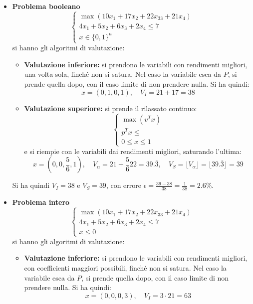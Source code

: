\documentclass[a4paper,11pt]{article}
\begin{document}
\begin{itemize}
	\item \textbf{\textsf{Problema booleano}} \\
	\[
		\begin{cases}
			\max(10 x_1 + 17 x_2 + 22 x_33 + 21 x_4) \\ 
			4 x_1 + 5 x_2 + 6 x_3 + 2 x_4 \leq 7 \\ 
			x \in \{ 0, 1 \}^n
		\end{cases}
	\]
	si hanno gli algoritmi di valutazione:
	\begin{itemize}
		\item \textbf{Valutazione inferiore:} si prendono le variabili con rendimenti migliori, una volta sola, finché non si satura.
			Nel caso la variabile esca da $P$, si prende quella dopo, con il caso limite di non prendere nulla.
			Si ha quindi:
			$$ x = (0, 1, 0, 1), \quad V_I = 21 + 17 = 38 $$
		\item \textbf{Valutazione superiore:} si prende il rilassato continuo:
			\[
				\begin{cases}
					\max (v^T x) \\ 
					p^T x \leq \\ 
					0 \leq x \leq 1
				\end{cases}
			\]
			e si riempie con le variabili dai rendimenti migliori, saturando l'ultima:
			$$ x = \left( 0, 0, \frac{5}{6}, 1 \right), \quad V_\alpha = 21 + \frac{5}{6} 22 = 39.\overline{3}, \quad V_S = \lfloor V_\alpha \rfloor = \lfloor 39.\overline{3} \rfloor = 39 $$
	\end{itemize}
	Si ha quindi $V_I = 38$ e $V_S = 39$, con errore $\epsilon = \frac{39 - 38}{38} = \frac{1}{38} = 2.6\%$.
\item \textbf{\textsf{Problema intero}} \\
	\[
		\begin{cases}
			\max(10 x_1 + 17 x_2 + 22 x_33 + 21 x_4) \\ 
			4 x_1 + 5 x_2 + 6 x_3 + 2 x_4 \leq 7 \\ 
			x \leq 0
		\end{cases}
	\]
	si hanno gli algoritmi di valutazione:
	\begin{itemize}
		\item \textbf{Valutazione inferiore:} si prendono le variabili con rendimenti migliori, con coefficienti maggiori possibili, finché non si satura.
			Nel caso la variabile esca da $P$, si prende quella dopo, con il caso limite di non prendere nulla.
			Si ha quindi:
			$$ x = (0, 0, 0, 3), \quad V_I = 3 \cdot 21 = 63 $$

\end{itemize}
\end{itemize}
\end{document}
